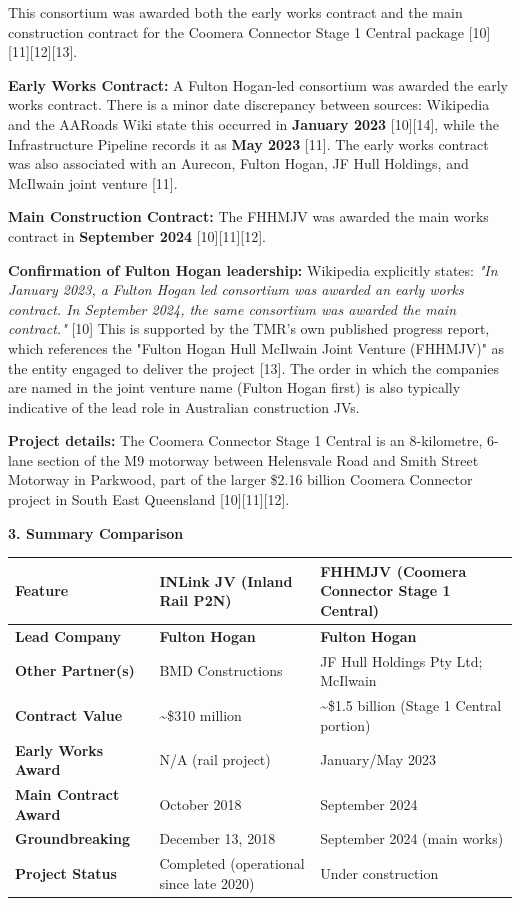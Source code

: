 \documentclass{llmxive}
\begin{document}
\begin{tcolorbox}
This consortium was awarded both the early works contract and the main construction contract for the Coomera Connector Stage 1 Central package [10][11][12][13].

\textbf{Early Works Contract:} A Fulton Hogan-led consortium was awarded the early works contract. There is a minor date discrepancy between sources: Wikipedia and the AARoads Wiki state this occurred in \textbf{January 2023} [10][14], while the Infrastructure Pipeline records it as \textbf{May 2023} [11]. The early works contract was also associated with an Aurecon, Fulton Hogan, JF Hull Holdings, and McIlwain joint venture [11].

\textbf{Main Construction Contract:} The FHHMJV was awarded the main works contract in \textbf{September 2024} [10][11][12].

\textbf{Confirmation of Fulton Hogan leadership:} Wikipedia explicitly states: \emph{"In January 2023, a Fulton Hogan led consortium was awarded an early works contract. In September 2024, the same consortium was awarded the main contract."} [10] This is supported by the TMR's own published progress report, which references the "Fulton Hogan Hull McIlwain Joint Venture (FHHMJV)" as the entity engaged to deliver the project [13]. The order in which the companies are named in the joint venture name (Fulton Hogan first) is also typically indicative of the lead role in Australian construction JVs.

\textbf{Project details:} The Coomera Connector Stage 1 Central is an 8-kilometre, 6-lane section of the M9 motorway between Helensvale Road and Smith Street Motorway in Parkwood, part of the larger \$2.16 billion Coomera Connector project in South East Queensland [10][11][12].

\smallskip\noindent\textbf{3. Summary Comparison}\par\smallskip

\begin{center}\footnotesize\begin{tabular}{@{}p{2.4cm}p{4.2cm}p{4.2cm}@{}}
\toprule
\textbf{Feature} & \textbf{INLink JV (Inland Rail P2N)} & \textbf{FHHMJV (Coomera Connector Stage 1 Central)} \\
\midrule
\textbf{Lead Company} & \textbf{Fulton Hogan} & \textbf{Fulton Hogan} \\
\textbf{Other Partner(s)} & BMD Constructions & JF Hull Holdings Pty Ltd; McIlwain \\
\textbf{Contract Value} & \textasciitilde{}\$310 million & \textasciitilde{}\$1.5 billion (Stage 1 Central portion) \\
\textbf{Early Works Award} & N/A (rail project) & January/May 2023 \\
\textbf{Main Contract Award} & October 2018 & September 2024 \\
\textbf{Groundbreaking} & December 13, 2018 & September 2024 (main works) \\
\textbf{Project Status} & Completed (operational since late 2020) & Under construction \\
\bottomrule
\end{tabular}\end{center}


\end{tcolorbox}
\end{document}

